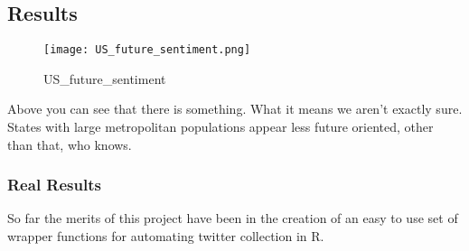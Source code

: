 \documentclass{article}
\begin{document}
\subsection{Results}

\begin{figure}[h!]
\centering
\texttt{[image: US\_future\_sentiment.png]}
\caption{US_future_sentiment}
\end{figure}

Above you can see that there is something. What it means we aren't exactly sure. States with large metropolitan populations appear less future oriented, other than that, who knows.

\subsubsection{Real Results}

So far the merits of this project have been in the creation of an easy to use set of wrapper functions for automating twitter collection in R. 




\end{document}
